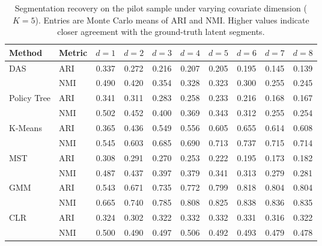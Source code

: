 \begin{table}[htbp]
\centering
\caption{Segmentation recovery on the pilot sample under varying covariate dimension ($K=5$). Entries are Monte Carlo means of ARI and NMI. Higher values indicate closer agreement with the ground-truth latent segments.}
\label{tab:app-ari-nmi-varying-d}
\begin{tabular}{llcccccccc}
\toprule
Method & Metric & $d=1$ & $d=2$ & $d=3$ & $d=4$ & $d=5$ & $d=6$ & $d=7$ & $d=8$ \\
\midrule
DAS & ARI & 0.337 & 0.272 & 0.216 & 0.207 & 0.205 & 0.195 & 0.145 & 0.139 \\
 & NMI & 0.490 & 0.420 & 0.354 & 0.328 & 0.323 & 0.300 & 0.255 & 0.245 \\
\addlinespace
Policy Tree & ARI & 0.341 & 0.311 & 0.283 & 0.258 & 0.233 & 0.216 & 0.168 & 0.167 \\
 & NMI & 0.502 & 0.452 & 0.400 & 0.369 & 0.343 & 0.312 & 0.255 & 0.254 \\
\addlinespace
K-Means & ARI & 0.365 & 0.436 & 0.549 & 0.556 & 0.605 & 0.655 & 0.614 & 0.608 \\
 & NMI & 0.545 & 0.603 & 0.685 & 0.690 & 0.713 & 0.737 & 0.715 & 0.714 \\
\addlinespace
MST & ARI & 0.308 & 0.291 & 0.270 & 0.253 & 0.222 & 0.195 & 0.173 & 0.182 \\
 & NMI & 0.487 & 0.437 & 0.397 & 0.379 & 0.341 & 0.313 & 0.279 & 0.281 \\
\addlinespace
GMM & ARI & 0.543 & 0.671 & 0.735 & 0.772 & 0.799 & 0.818 & 0.804 & 0.804 \\
 & NMI & 0.665 & 0.740 & 0.785 & 0.808 & 0.825 & 0.838 & 0.836 & 0.835 \\
\addlinespace
CLR & ARI & 0.324 & 0.302 & 0.322 & 0.332 & 0.332 & 0.331 & 0.316 & 0.322 \\
 & NMI & 0.500 & 0.490 & 0.497 & 0.506 & 0.492 & 0.493 & 0.479 & 0.478 \\
\bottomrule
\end{tabular}
\end{table}


